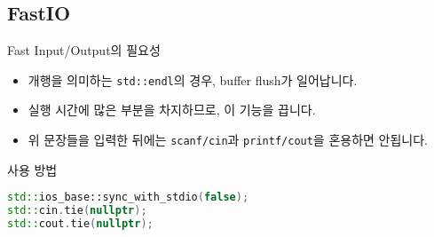 \subsection{FastIO}
\begin{frame}[fragile]{\textbf{\currentname}}
    \vspace{0.5cm}
    
    \begin{block}{Fast Input/Output의 필요성}
        \begin{itemize}
            \item 개행을 의미하는 \texttt{std::endl}의 경우, buffer flush가 일어납니다.
            \item 실행 시간에 많은 부분을 차지하므로, 이 기능을 끕니다.
            \item 위 문장들을 입력한 뒤에는 \texttt{scanf/cin}과 \texttt{printf/cout}을 혼용하면 안됩니다.
        \end{itemize}
    \end{block}

    \begin{block}{사용 방법}
        \begin{lstlisting}[language=C++, xleftmargin=10pt]
std::ios_base::sync_with_stdio(false);
std::cin.tie(nullptr);
std::cout.tie(nullptr);
\end{lstlisting}
    \end{block}
\end{frame}